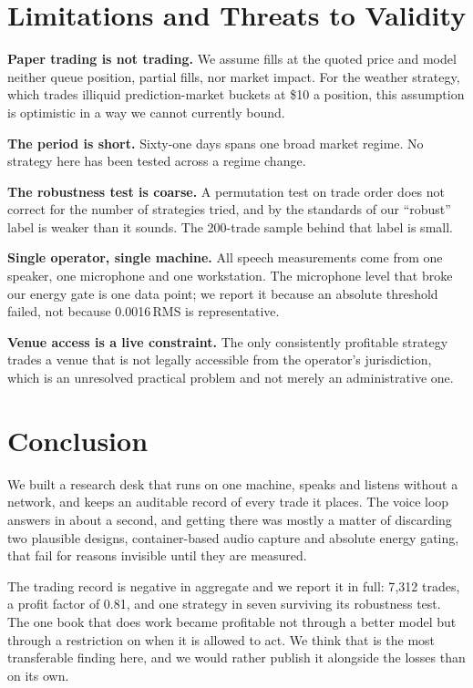 \documentclass[conference]{IEEEtran}
\begin{document}
\section{Limitations and Threats to Validity}
\label{sec:limits}

\textbf{Paper trading is not trading.} We assume fills at the quoted price and
model neither queue position, partial fills, nor market impact. For the weather
strategy, which trades illiquid prediction-market buckets at \$10 a position,
this assumption is optimistic in a way we cannot currently bound.

\textbf{The period is short.} Sixty-one days spans one broad market regime. No
strategy here has been tested across a regime change.

\textbf{The robustness test is coarse.} A permutation test on trade order does
not correct for the number of strategies tried, and by the standards of
\cite{bailey2014} our ``robust'' label is weaker than it sounds. The 200-trade
sample behind that label is small.

\textbf{Single operator, single machine.} All speech measurements come from one
speaker, one microphone and one workstation. The microphone level that broke
our energy gate is one data point; we report it because an absolute threshold
failed, not because 0.0016\,RMS is representative.

\textbf{Venue access is a live constraint.} The only consistently profitable
strategy trades a venue that is not legally accessible from the operator's
jurisdiction, which is an unresolved practical problem and not merely an
administrative one.

\section{Conclusion}

We built a research desk that runs on one machine, speaks and listens without a
network, and keeps an auditable record of every trade it places. The voice loop
answers in about a second, and getting there was mostly a matter of discarding
two plausible designs, container-based audio capture and absolute energy
gating, that fail for reasons invisible until they are measured.

The trading record is negative in aggregate and we report it in full: 7{,}312
trades, a profit factor of 0.81, and one strategy in seven surviving its
robustness test. The one book that does work became profitable not through a
better model but through a restriction on when it is allowed to act. We think
that is the most transferable finding here, and we would rather publish it
alongside the losses than on its own.
\end{document}
